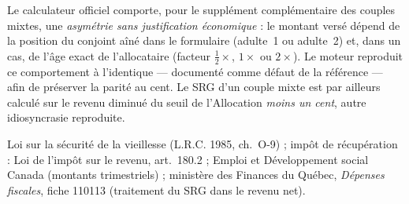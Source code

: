 \pnotes Le calculateur officiel comporte, pour le supplément complémentaire
des couples mixtes, une \emph{asymétrie sans justification économique} : le
montant versé dépend de la position du conjoint aîné dans le formulaire
(adulte~1 ou adulte~2) et, dans un cas, de l'âge exact de l'allocataire
(facteur $\frac12\times$, $1\times$ ou $2\times$). Le moteur reproduit ce
comportement à l'identique --- documenté comme défaut de la référence ---
afin de préserver la parité au cent. Le SRG d'un couple mixte est par
ailleurs calculé sur le revenu diminué du seuil de l'Allocation \emph{moins
un cent}, autre idiosyncrasie reproduite.



\prefs Loi sur la sécurité de la vieillesse (L.R.C. 1985, ch.~O-9) ; impôt
de récupération : Loi de l'impôt sur le revenu, art.~180.2 ; Emploi et
Développement social Canada (montants trimestriels) ; ministère des
Finances du Québec, \emph{Dépenses fiscales}, fiche 110113 (traitement du
SRG dans le revenu net).
